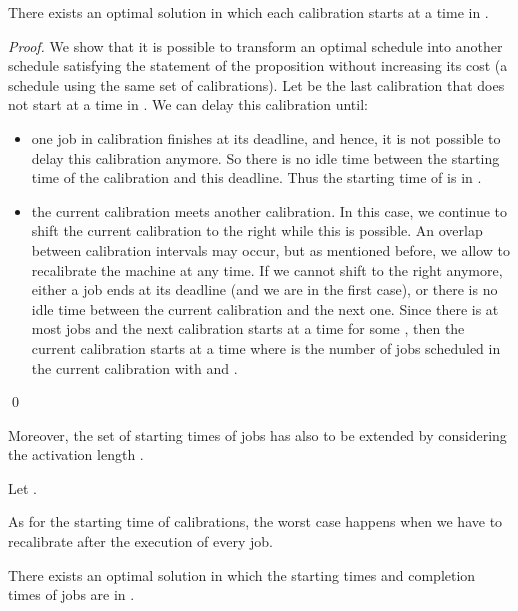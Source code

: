 \begin{prop}\label{prop:act_position_calibration}
There exists an optimal solution in which each calibration starts at a time in .
\end{prop}
\begin{proof}
We show that it is possible to transform an optimal schedule into another schedule satisfying the statement of the proposition without increasing its cost (a schedule using the same set of calibrations). Let  be the last calibration that does not start at a time in . We can delay this calibration until:
\begin{itemize}
\item one job in calibration  finishes at its deadline, and hence, it is not possible to delay this calibration anymore. So there is no idle time between the starting time of the calibration  and this deadline. Thus the starting time of  is in .
\item the current calibration meets another calibration. In this case, we continue to shift the current calibration to the right while this is possible. An overlap between calibration intervals may occur, but as mentioned before, we allow to recalibrate the machine at any time. If we cannot shift to the right anymore, either a job ends at its deadline (and we are in the first case), or there is no idle time between the current calibration and the next one. Since there is at most  jobs and the next calibration starts at a time  for some , then the current calibration starts at a time  where  is the number of jobs scheduled in the current calibration with  and .
\end{itemize}
\qed\end{proof}


Moreover, the set of starting times of jobs has also to be extended by considering the activation length .




\begin{definition}
Let .
\end{definition}

As for the starting time of calibrations, the worst case happens when we have to recalibrate after the execution of every job.


\begin{prop}\label{prop:act_position_job}
There exists an optimal solution in which the starting times and completion times of jobs are in .
\end{prop}

